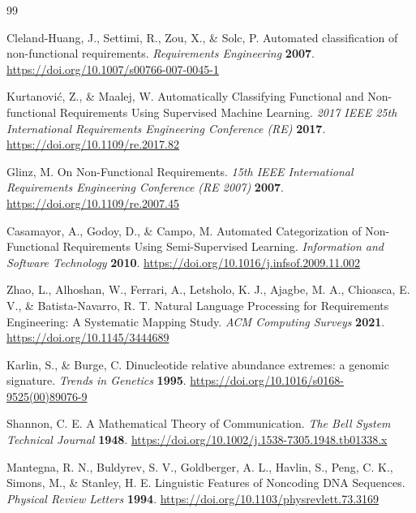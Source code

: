 \begin{thebibliography}{99}

Cleland-Huang, J., Settimi, R., Zou, X., \& Solc, P. Automated classification of non-functional requirements. \emph{Requirements Engineering} \textbf{2007}. \url{https://doi.org/10.1007/s00766-007-0045-1}

Kurtanović, Z., \& Maalej, W. Automatically Classifying Functional and Non-functional Requirements Using Supervised Machine Learning. \emph{2017 IEEE 25th International Requirements Engineering Conference (RE)} \textbf{2017}. \url{https://doi.org/10.1109/re.2017.82}

Glinz, M. On Non-Functional Requirements. \emph{15th IEEE International Requirements Engineering Conference (RE 2007)} \textbf{2007}. \url{https://doi.org/10.1109/re.2007.45}

Casamayor, A., Godoy, D., \& Campo, M. Automated Categorization of Non-Functional Requirements Using Semi-Supervised Learning. \emph{Information and Software Technology} \textbf{2010}. \url{https://doi.org/10.1016/j.infsof.2009.11.002}

Zhao, L., Alhoshan, W., Ferrari, A., Letsholo, K. J., Ajagbe, M. A., Chioasca, E. V., \& Batista-Navarro, R. T. Natural Language Processing for Requirements Engineering: A Systematic Mapping Study. \emph{ACM Computing Surveys} \textbf{2021}. \url{https://doi.org/10.1145/3444689}

Karlin, S., \& Burge, C. Dinucleotide relative abundance extremes: a genomic signature. \emph{Trends in Genetics} \textbf{1995}. \url{https://doi.org/10.1016/s0168-9525(00)89076-9}

Shannon, C. E. A Mathematical Theory of Communication. \emph{The Bell System Technical Journal} \textbf{1948}. \url{https://doi.org/10.1002/j.1538-7305.1948.tb01338.x}

Mantegna, R. N., Buldyrev, S. V., Goldberger, A. L., Havlin, S., Peng, C. K., Simons, M., \& Stanley, H. E. Linguistic Features of Noncoding DNA Sequences. \emph{Physical Review Letters} \textbf{1994}. \url{https://doi.org/10.1103/physrevlett.73.3169}


\end{thebibliography}
